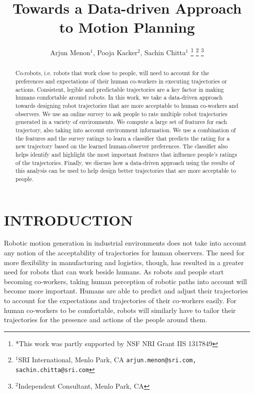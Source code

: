 \documentclass[letterpaper, 10 pt, conference]{ieeeconf}  %
\title{\LARGE \bf
Towards a Data-driven Approach to Motion Planning
}
\author{Arjun Menon$^{1}$, Pooja Kacker$^{2}$, Sachin Chitta$^{1}$%
\thanks{*This work was partly supported by NSF NRI Grant IIS 1317849}%
\thanks{$^{1}$SRI International, Menlo Park, CA
        {\tt\small arjun.menon@sri.com, sachin.chitta@sri.com}}%
\thanks{$^{2}$Independent Consultant, Menlo Park, CA
        {\tt\small }}%
}
\begin{document}
\maketitle
\thispagestyle{empty}
\pagestyle{empty}


\begin{abstract}

Co-robots, i.e. robots that work close to people, will need to account for the preferences and expectations of their human 
co-workers in executing trajectories or actions. Consistent, legible and predictable trajectories are a key factor in making humans comfortable 
around robots. In this work, we take a data-driven approach towards designing robot trajectories that are more acceptable 
to human co-workers and observers. We use an online survey to ask people to rate multiple robot trajectories generated in a variety of environments. 
We compute a large set of features for each trajectory, also taking into account environment information. We use a combination 
of the features and the survey ratings to learn a classifier that predicts the rating for a new trajectory based on the learned 
human-observer preferences. The classifier also helps identify and highlight the most important features 
that influence people's ratings of the trajectories. Finally, we discuss how a data-driven approach using the 
results of this analysis can be used to help design better trajectories that are more acceptable to people.
\end{abstract}


\section{INTRODUCTION}

Robotic motion generation in industrial environments does not take 
into account any notion of the acceptability of trajectories for human observers. The need for more flexibility in manufacturing and logistics, 
though, has resulted in a greater need for robots that can work beside humans. As robots and people start becoming co-workers, taking 
human perception of robotic paths into account will become more important. Humans are able to predict and adjust their trajectories to 
account for the expectations and trajectories of their co-workers easily. For human co-workers to be comfortable, robots will similarly 
have to tailor their trajectories for the presence and actions of the people around them. 
\end{document}
